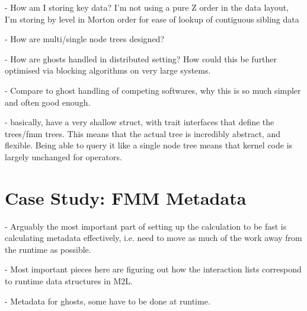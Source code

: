 - How am I storing key data? I'm not using a pure Z order in the data layout, I'm storing by level in Morton order for ease of lookup of contiguous sibling data

- How are multi/single node trees designed?

- How are ghosts handled in distributed setting? How could this be further optimised via blocking algorithms on very large systems.

- Compare to ghost handling of competing softwares, why this is so much simpler and often good enough.

- basically, have a very shallow struct, with trait interfaces that define the trees/fmm trees. This means that the actual tree is incredibly abstract, and flexible. Being able to query it like a single node tree means that kernel code is largely unchanged for operators.

\section{Case Study: FMM Metadata}

- Arguably the most important part of setting up the calculation to be fast is calculating metadata effectively, i.e. need to move as much of the work away from the runtime as possible.

- Most important pieces here are figuring out how the interaction lists correspond to runtime data structures in M2L.

- Metadata for ghosts, some have to be done at runtime.



